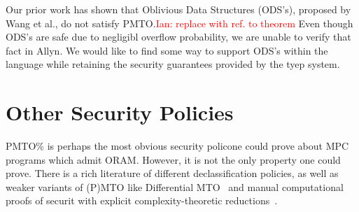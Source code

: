 \documentclass{report}
\newcommand{\lang}{Allyn\xspace}
\newcommand{\ins}[1]{\textcolor{red}{Ian: #1}}
\begin{document}
Our prior work has shown that Oblivious Data Structures (ODS's), proposed by Wang et al., do not satisfy PMTO.\ins{replace with ref. to theorem} Even though ODS's are safe due to negligibl overflow probability, we are unable to verify that fact in \lang. We would like to find some
way to support ODS's within the language while retaining the security guarantees provided by the tyep system.

\section{Other Security Policies}

PMTO\% is perhaps the most obvious security policone could prove about MPC programs which admit ORAM. However, it is not the only property
one could prove. There is a rich literature of different declassification policies, as well as weaker variants of (P)MTO like Differential
MTO~\cite{} and manual computational proofs of securit with explicit complexity-theoretic reductions~\cite{easycrypt}.
\end{document}
